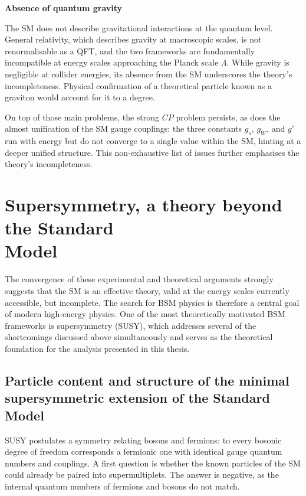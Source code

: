 \vspace{0.5 cm}
\noindent\textbf{Absence of quantum gravity}
\vspace{0.5 cm}


The SM does not describe gravitational interactions at the quantum level. General relativity, which describes gravity at macroscopic scales, is not renormalisable as a QFT, and the two frameworks are fundamentally incompatible at energy scales approaching the Planck scale $\Lambda$. While gravity is negligible at collider energies, its absence from the SM underscores the theory's incompleteness. Physical confirmation of a theoretical particle known as a graviton would account for it to a degree.

\vspace{0.5 cm}

On top of those main problems, the strong $CP$ problem persists, as does the almost unification of the SM gauge couplings: the three constants $g_s$, $g_W$, and $g'$ run with energy but do not converge to a single value within the SM, hinting at a deeper unified structure. This non-exhaustive list of issues further emphasises the theory's incompleteness.



\section[Supersymmetry, a theory beyond the Standard Model]{Supersymmetry, a theory beyond the Standard \\Model}
\label{sec:bsm}

The convergence of these experimental and theoretical arguments strongly suggests that the SM is an effective theory, valid at the energy scales currently accessible, but incomplete. The search for BSM physics is therefore a central goal of modern high-energy physics. One of the most theoretically motivated BSM frameworks is supersymmetry (SUSY), which addresses several of the shortcomings discussed above simultaneously and serves as the theoretical foundation for the analysis presented in this thesis.

\subsection{Particle content and structure of the minimal supersymmetric extension of the Standard Model}

SUSY postulates a symmetry relating bosons and fermions: to every bosonic degree of freedom corresponds a fermionic one with identical gauge quantum numbers and couplings. A first question is whether the known particles of the SM could already be paired into supermultiplets. The answer is negative, as the internal quantum numbers of fermions and bosons do not match.


